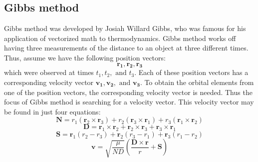 \documentclass[12pt]{article}
\begin{document}
		
		
		

	\newpage
	\subsection{Gibbs method}
	Gibbs method was developed by Josiah Willard Gibbs\cite{gibbsBio}, who was famous for his application of vectorized math to thermodynamics. Gibbs method works off having three measurements of the distance to an object at three different times. Thus, assume we have the following position vectors:
	\begin{equation}
	\boldsymbol{r_1}, 	\boldsymbol{r_2},	\boldsymbol{r_3}
	\end{equation}
	which were observed at times $t_1, t_2, \text{ and  } t_3$. Each of these position vectors has a corresponding velocity vector $\boldsymbol{v_1}, 	\boldsymbol{v_2},	\text{ and  } \boldsymbol{v_3}$. To obtain the orbital elements from one of the position vectors, the corresponding velocity vector is needed. Thus the focus of Gibbs method is searching for a velocity vector. This velocity vector may be found in just four equations:
	\begin{equation}
	\mathbf { N } = r _ { 1 } \left( \mathbf { r } _ { 2 } \times \mathbf { r } _ { 3 } \right) + r _ { 2 } \left( \mathbf { r } _ { 3 } \times \mathbf { r } _ { 1 } \right) + r _ { 3 } \left( \mathbf { r } _ { 1 } \times \mathbf { r } _ { 2 } \right)
	\end{equation}
	\begin{equation}
	\mathbf { D } = \mathbf { r } _ { 1 } \times \mathbf { r } _ { 2 } + \mathbf { r } _ { 2 } \times \mathbf { r } _ { 3 } + \mathbf { r } _ { 3 } \times \mathbf { r } _ { 1 }
	\end{equation}
	\begin{equation}
	\mathbf { S } = \mathbf { r } _ { 1 } \left( r _ { 2 } - r _ { 3 } \right) + \mathbf { r } _ { 2 } \left( r _ { 3 } - r _ { 1 } \right) + \mathbf { r } _ { 3 } \left( r _ { 1 } - r _ { 2 } \right)
	\end{equation}
	\begin{equation}
	\mathbf { v } = \sqrt { \frac { \mu } { N D } } \left( \frac { \mathbf { D } \times \mathbf { r } } { r } + \mathbf { S } \right)
	\end{equation}
	
\end{document}
